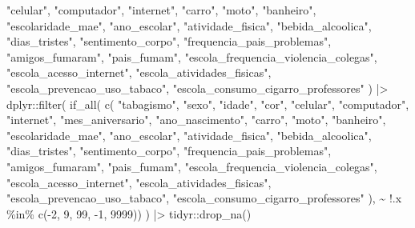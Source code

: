 \documentclass[
]{article}
\newenvironment{Shaded}{\begin{snugshade}}{\end{snugshade}}
\newcommand{\DecValTok}[1]{\textcolor[rgb]{0.68,0.00,0.00}{#1}}
\newcommand{\FunctionTok}[1]{\textcolor[rgb]{0.28,0.35,0.67}{#1}}
\newcommand{\NormalTok}[1]{\textcolor[rgb]{0.00,0.23,0.31}{#1}}
\newcommand{\SpecialCharTok}[1]{\textcolor[rgb]{0.37,0.37,0.37}{#1}}
\newcommand{\StringTok}[1]{\textcolor[rgb]{0.13,0.47,0.30}{#1}}
\begin{document}
\begin{Shaded}
\begin{Highlighting}[]
    \StringTok{"celular"}\NormalTok{,}
    \StringTok{"computador"}\NormalTok{,}
    \StringTok{"internet"}\NormalTok{,}
    \StringTok{"carro"}\NormalTok{,}
    \StringTok{"moto"}\NormalTok{,}
    \StringTok{"banheiro"}\NormalTok{,}
    \StringTok{"escolaridade\_mae"}\NormalTok{,}
    \StringTok{"ano\_escolar"}\NormalTok{,}
    \StringTok{"atividade\_fisica"}\NormalTok{,}
    \StringTok{"bebida\_alcoolica"}\NormalTok{,}
    \StringTok{"dias\_tristes"}\NormalTok{,}
    \StringTok{"sentimento\_corpo"}\NormalTok{,}
    \StringTok{"frequencia\_pais\_problemas"}\NormalTok{,}
    \StringTok{"amigos\_fumaram"}\NormalTok{,}
    \StringTok{"pais\_fumam"}\NormalTok{,}
    \StringTok{"escola\_frequencia\_violencia\_colegas"}\NormalTok{,}
    \StringTok{"escola\_acesso\_internet"}\NormalTok{,}
    \StringTok{"escola\_atividades\_fisicas"}\NormalTok{,}
    \StringTok{"escola\_prevencao\_uso\_tabaco"}\NormalTok{,}
    \StringTok{"escola\_consumo\_cigarro\_professores"}
\NormalTok{  ) }\SpecialCharTok{|\textgreater{}}
\NormalTok{  dplyr}\SpecialCharTok{::}\FunctionTok{filter}\NormalTok{(}
    \FunctionTok{if\_all}\NormalTok{(}
      \FunctionTok{c}\NormalTok{(}
        \StringTok{"tabagismo"}\NormalTok{,}
        \StringTok{"sexo"}\NormalTok{,}
        \StringTok{"idade"}\NormalTok{,}
        \StringTok{"cor"}\NormalTok{,}
        \StringTok{"celular"}\NormalTok{,}
        \StringTok{"computador"}\NormalTok{,}
        \StringTok{"internet"}\NormalTok{,}
        \StringTok{"mes\_aniversario"}\NormalTok{,}
        \StringTok{"ano\_nascimento"}\NormalTok{,}
        \StringTok{"carro"}\NormalTok{,}
        \StringTok{"moto"}\NormalTok{,}
        \StringTok{"banheiro"}\NormalTok{,}
        \StringTok{"escolaridade\_mae"}\NormalTok{,}
        \StringTok{"ano\_escolar"}\NormalTok{,}
        \StringTok{"atividade\_fisica"}\NormalTok{,}
        \StringTok{"bebida\_alcoolica"}\NormalTok{,}
        \StringTok{"dias\_tristes"}\NormalTok{,}
        \StringTok{"sentimento\_corpo"}\NormalTok{,}
        \StringTok{"frequencia\_pais\_problemas"}\NormalTok{,}
        \StringTok{"amigos\_fumaram"}\NormalTok{,}
        \StringTok{"pais\_fumam"}\NormalTok{,}
        \StringTok{"escola\_frequencia\_violencia\_colegas"}\NormalTok{,}
        \StringTok{"escola\_acesso\_internet"}\NormalTok{,}
        \StringTok{"escola\_atividades\_fisicas"}\NormalTok{,}
        \StringTok{"escola\_prevencao\_uso\_tabaco"}\NormalTok{,}
        \StringTok{"escola\_consumo\_cigarro\_professores"}
\NormalTok{      ),}
      \SpecialCharTok{\textasciitilde{}} \SpecialCharTok{!}\NormalTok{.x }\SpecialCharTok{\%in\%} \FunctionTok{c}\NormalTok{(}\SpecialCharTok{{-}}\DecValTok{2}\NormalTok{, }\DecValTok{9}\NormalTok{, }\DecValTok{99}\NormalTok{, }\SpecialCharTok{{-}}\DecValTok{1}\NormalTok{, }\DecValTok{9999}\NormalTok{))}
\NormalTok{  ) }\SpecialCharTok{|\textgreater{}}
\NormalTok{  tidyr}\SpecialCharTok{::}\FunctionTok{drop\_na}\NormalTok{()}
\end{Highlighting}
\end{Shaded}
\end{document}
